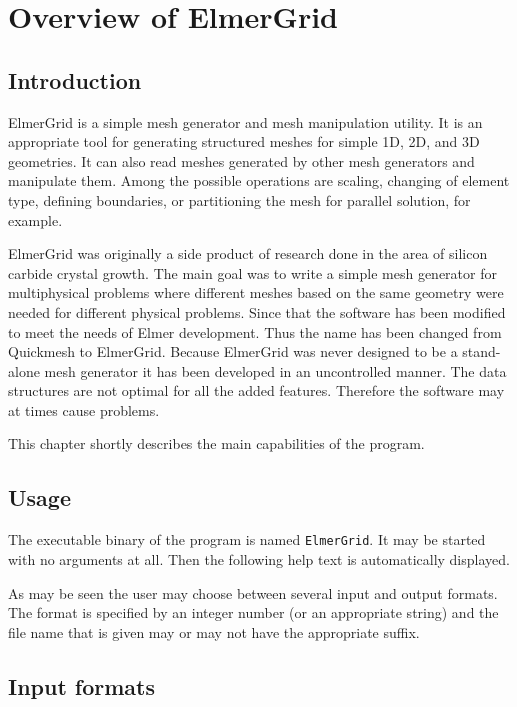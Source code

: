 \chapter{Overview of ElmerGrid}

\section{Introduction}

ElmerGrid is a simple mesh generator and 
mesh manipulation utility. 
It is an appropriate tool for generating structured meshes for 
simple 1D, 2D, and 3D geometries. 
It can also read meshes generated by other mesh generators and 
manipulate them. Among the possible operations are
scaling, changing of element type, 
defining boundaries, or partitioning the mesh for parallel solution, 
for example.

ElmerGrid was originally a side product of research done in the area
of silicon carbide crystal growth.
The main goal was to write a simple mesh generator for multiphysical
problems where different meshes based on the same geometry were needed for different physical problems.
Since that the software has been modified to meet the 
needs of Elmer development.
Thus the name has been changed from Quickmesh to ElmerGrid.
Because ElmerGrid was never designed to be a stand-alone mesh generator 
it has been developed in an uncontrolled manner. The data structures 
are not optimal for all the added features. Therefore the software may
at times cause problems.

This chapter shortly describes the main 
capabilities of the program.


\section{Usage}
The executable binary of the program is named {\tt ElmerGrid}.
It may be started with no arguments at
all. Then the following help text is automatically 
displayed.



As may be seen the user may choose between several 
input and output formats. The format is specified 
by an integer number (or an appropriate string) and the file name that is given may 
or may not have the appropriate suffix.


\section{Input formats}

